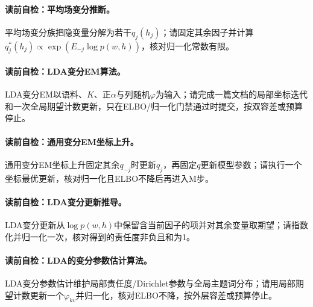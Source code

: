 \paragraph{读前自检：平均场变分推断。}平均场变分族把隐变量分解为若干$q_j(h_j)$；请固定其余因子并计算$q_j^*(h_j)\propto\exp(E_{-j}\log p(w,h))$，核对归一化常数有限。\par
\paragraph{读前自检：LDA变分EM算法。}LDA变分EM以语料、$K$、正$\alpha$与列随机$\varphi$为输入；请完成一篇文档的局部坐标迭代和一次全局期望计数更新，只在ELBO/归一化门禁通过时提交，按双容差或预算停止。\par
\paragraph{读前自检：通用变分EM坐标上升。}通用变分EM坐标上升固定其余$q_{-j}$时更新$q_j$，再固定$q$更新模型参数；请执行一个坐标最优更新，核对归一化且ELBO不降后再进入M步。\par
\paragraph{读前自检：LDA变分更新推导。}LDA变分更新从$\log p(w,h)$中保留含当前因子的项并对其余变量取期望；请指数化并归一化一次，核对得到的责任度非负且和为1。\par
\paragraph{读前自检：LDA的变分参数估计算法。}LDA变分参数估计维护局部责任度/Dirichlet参数与全局主题词分布；请用局部期望计数更新一个$\varphi_{kv}$并归一化，核对ELBO不降，按外层容差或预算停止。\par


